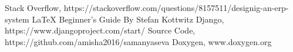 
\begin{thebibliography}{9}
\bibitem{} Stack Overflow, https://stackoverflow.com/questions/8157511/designig-an-erp-system
\bibitem{} \LaTeX{} Beginner's Guide By Stefan Kottwitz 
\bibitem{} Django, https://www.djangoproject.com/start/
\bibitem{} Source Code, https://github.com/amisha2016/samanyaseva
\bibitem{} Doxygen, www.doxygen.org
\end{thebibliography}



